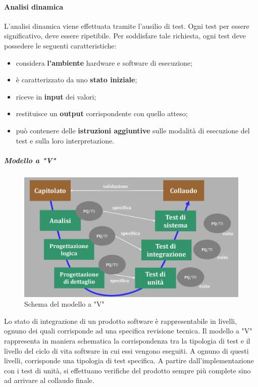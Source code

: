 \paragraph{Analisi dinamica}
L'analisi dinamica viene effettuata tramite l'ausilio di test. Ogni test per essere significativo, deve essere ripetibile. Per soddisfare tale richiesta, ogni test deve possedere le seguenti caratteristiche:
\begin{itemize}
	\item considera \textbf{l'ambiente} hardware e software di esecuzione;
	\item è caratterizzato da uno \textbf{stato iniziale};
	\item riceve in \textbf{input} dei valori;
	\item restituisce un \textbf{output} corrispondente con quello atteso;
	\item può contenere delle \textbf{istruzioni aggiuntive} sulle modalità di esecuzione del test e sulla loro interpretazione.
\end{itemize}

\subparagraph*{Modello a "V"}
\begin{figure}[h!]
	\caption{Schema del modello a "V"}
	\centering
	\includegraphics[width=\textwidth]{res/img/modelloV.png}
\end{figure}
Lo stato di integrazione di un prodotto software è rappresentabile in livelli, ognuno dei quali corrisponde ad una specifica revisione tecnica. Il modello a "V" rappresenta in maniera schematica la corrispondenza tra la tipologia di test e il livello del ciclo di vita software in cui essi vengono eseguiti. A ognuno di questi livelli, corrisponde una tipologia di test specifica. A partire dall'implementazione con i test di unità, si effettuano verifiche del prodotto sempre più complete sino ad arrivare al collaudo finale.

